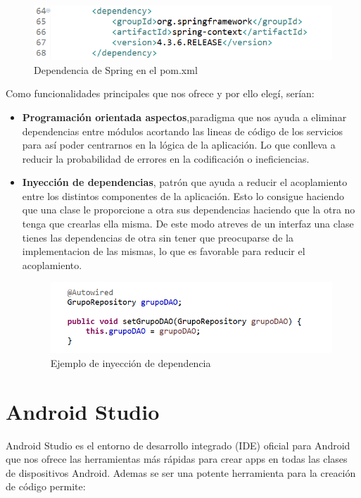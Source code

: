 \begin{figure}[H]
		\centering
		\includegraphics[width=1\textwidth] {spring.png}
		\caption{Dependencia de Spring en el pom.xml }
	\end{figure}
	
	
Como funcionalidades principales que nos ofrece y por ello elegí, serían:

\begin{itemize}
\item \textbf{Programación orientada aspectos},paradigma que nos ayuda a eliminar dependencias entre módulos acortando las lineas de código de los servicios para así poder centrarnos en la lógica de la aplicación. Lo que conlleva a reducir  la probabilidad de errores en la codificación o ineficiencias.


\item\textbf{ Inyección de dependencias}, patrón que ayuda a reducir el acoplamiento entre los distintos componentes de la aplicación. Esto lo consigue haciendo que una clase le proporcione a otra sus dependencias haciendo que la otra no tenga que crearlas ella misma. De este modo atreves de un interfaz una clase tienes las dependencias de otra sin tener que preocuparse de la implementacion de las mismas, lo que es favorable para reducir el acoplamiento.

\begin{figure}[H]
		\centering
		\includegraphics[width=1\textwidth] {dao.png}
		\caption{Ejemplo de inyección de dependencia }
	\end{figure}


\end{itemize}


\section{Android Studio}
Android Studio es el entorno de desarrollo integrado (IDE)  oficial para Android que nos ofrece las herramientas más rápidas para crear apps en todas las clases de dispositivos Android.
Ademas se ser una potente herramienta para la creación de código permite:

